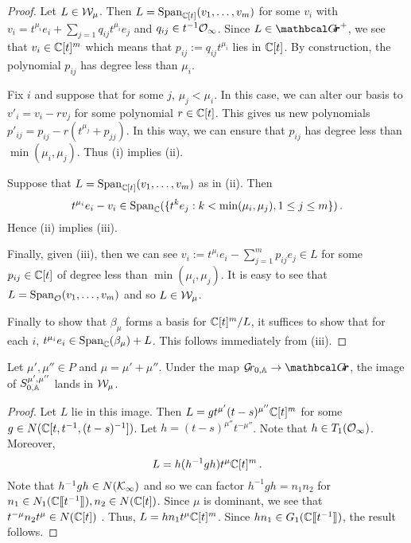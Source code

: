 \documentclass[draft]{article}
\begin{document}
\begin{proof}
    Let $ L \in \cW_\mu$.  Then $ L = \Sp_{\CC[t]}(v_1, \dots, v_m) $ for some $ v_i $ with $ v_i = t^{\mu_i} e_i + \sum_{j=1} q_{ij}t^{\mu_i} e_j $ and $ q_{ij} \in t^{-1} \Oinf$.  Since $ L \in \Grth^+ $, we see that $ v_i \in \CC[t]^m$ which means that $ p_{ij} := q_{ij}t^{\mu_i} $ lies in $ \CC[t]$.  By construction, the polynomial $ p_{ij}$ has degree less than $ \mu_i$.
    
    Fix $ i$ and suppose that for some $ j$, $ \mu_j < \mu_i$.  In this case, we can alter our basis to $ v'_i = v_i - r v_j$ for some polynomial $r \in \CC[t]$.  This gives us new polynomials $ p'_{ij} = p_{ij} - r (t^{\mu_j} + p_{jj}) $.  In this way, we can ensure that $ p_{ij} $ has degree less than $ \min(\mu_i, \mu_j)$.  Thus (i) implies (ii).
    
    Suppose that $ L = \Sp_{\CC[t]}(v_1, \dots, v_m)$ as in (ii).  Then
    $$t^{\mu_i} e_i - v_i \in \Sp_\CC(\{t^k e_j :  k < \min(\mu_i, \mu_j), 1 \le j \le m \})  \,. $$
    Hence (ii) implies (iii).  

    Finally, given (iii), then we can see $ v_i := t^{\mu_i} e_i - \sum_{j=1}^m p_{ij} e_j \in L $ for some $ p_{ij} \in \CC[t]$ of degree less than $ \min(\mu_i,\mu_j) $.  It is easy to see that $ L = \Sp_\cO(v_1, \dots, v_m) $ and so $ L \in \cW_\mu$.  
    
    Finally to show that $ \beta_\mu$ forms a basis for $ \CC[t]^m/L$, it suffices to show that for each $ i$, $ t^{\mu_i} e_i  \in \Sp_\CC(\beta_\mu) + L$.   This follows immediately from (iii).
    \end{proof}

\begin{lemma}
    Let $\mu',\mu'' \in P$ and $\mu = \mu' + \mu''$. Under the map $ \Grbd \rightarrow \Grth$, the image of $ S^{\mu', \mu''}_{0,\AA}$ lands in $ \cW_\mu$.
\end{lemma}

\begin{proof}
    Let $ L $ lie in this image.  Then $ L = g t^{\mu'} (t-s)^{\mu''}\CC[t]^m$ for some $ g \in N(\CC[t, t^{-1}, (t-s)^{-1}]) $.  Let $ h =(t-s)^{\mu''} t^{-\mu''}  $.  Note that $ h \in T_1(\Oinf)$. 
    Moreover,
    $$ L = h (h^{-1} g h) t^{\mu}\CC[t]^m\,. $$
    Note that 
    $h^{-1} g h \in N(\cK_\infty)$ and so we can factor $ h^{-1} g h = n_1 n_2$ for $ n_1 \in N_1(\CC\xt[t^{-1}]), n_2 \in N(\CC[t]) $.  Since $ \mu $ is dominant, we see that $ t^{-\mu} n_2 t^\mu \in N(\CC[t]) $ .  Thus, $ L = h n_1 t^\mu \CC[t]^m$.  Since $ hn_1 \in G_1(\CC\xt[t^{-1}])$, the result follows.
    \end{proof}
\end{document}

